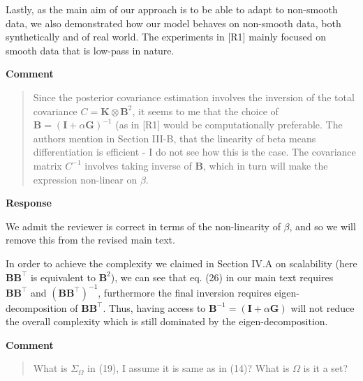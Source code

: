 \documentclass[11pt,onecolumn,journal]{IEEEtran}
\theoremstyle{definition}
\begin{document}
Lastly, as the main aim of our approach is to be able to adapt to non-smooth data, we also demonstrated how our model behaves on non-smooth data, both synthetically and of real world. The experiments in [R1] mainly focused on smooth data that is low-pass in nature.

\iffalse
emphasise main contributions:
1. generative model and filtering interpretation
2. spectral learning
3. link to co-regionalisation
4. behaviour of model under non-smooth signals

argue:
1. the generative model in [6] is not motivated from a signal filtering perspective; it is from the perspective of optimisation in eq.(2)
2. (2) and (3) in [6] inherently assume de-noising hence low-pass filtering
\fi

\textbf{Comment}
\begin{quote}
Since the posterior covariance estimation involves the inversion of the total covariance $C=\mathbf{K}\otimes \mathbf{B}^2$, it seems to me that the choice of $\mathbf{B}= (\mathbf{I}+\alpha \mathbf{G})^{-1}$ (as in [R1] would be computationally preferable. The authors mention in Section III-B, that the linearity of beta means differentiation is efficient - I do not see how this is the case. The covariance matrix $C^{-1}$ involves taking inverse of $\mathbf{B}$, which in turn will make the expression non-linear on $\beta$.
\end{quote}

\textbf{Response}

We admit the reviewer is correct in terms of the non-linearity of $\beta$, and so we will remove this from the revised main text.

In order to achieve the complexity we claimed in Section IV.A on scalability (here $\mathbf{BB}^\top$ is equivalent to $\mathbf{B}^2$), we can see that eq. (26) in our main text requires $\mathbf{BB}^\top$ and $(\mathbf{BB}^\top)^{-1}$, furthermore the final inversion requires eigen-decomposition of $\mathbf{BB}^\top$. Thus, having access to $\mathbf{B}^{-1} = (\mathbf{I} + \alpha \mathbf{G})$ will not reduce the overall complexity which is still dominated by the eigen-decomposition.

\vspace{0.3cm}

\textbf{Comment}
\begin{quote}
What is $\Sigma_\Omega$ in (19), I assume it is same as in (14)?
What is $\Omega$ is it a set?
\end{quote}
\end{document}
